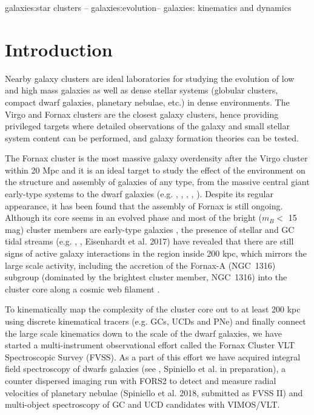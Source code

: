 \documentclass[useAMS,usenatbib]{mn2e}
\begin{document}
\begin{keywords}
galaxies:star clusters -- galaxies:evolution-- galaxies: kinematics and dynamics
\end{keywords}

\section{Introduction}

Nearby galaxy clusters are ideal laboratories for studying the evolution of 
low and high mass galaxies as well as dense stellar systems (globular 
clusters, compact dwarf galaxies, planetary nebulae, etc.) in dense environments. 
The Virgo and Fornax clusters are the closest galaxy clusters, hence providing 
privileged targets where detailed observations of the galaxy and small stellar 
system content can be performed, and galaxy formation theories can be tested. 

The Fornax cluster is the most massive galaxy overdensity after the Virgo cluster 
within 20 Mpc and it is an ideal target to study the effect of the environment 
on the structure and assembly of galaxies of any type, from the massive central 
giant early-type systems to the dwarf galaxies (e.g. \citealt{Ferguson89},  
\citealt{munoz+15}, \citealt{Iodice+16}, \citealt{venhola+17}, 
\citealt{Eigenthaler18}). Despite its regular appearance, 
it has been found that the assembly of Fornax is still ongoing. 
Although its core seems in an evolved phase \citep{Grillmair94,Jordan07} 
and most of the bright ($m_B < $  15 mag) cluster members are 
early-type galaxies \citep{Ferguson89}, the presence of stellar and GC tidal 
streams (e.g. \citealt{Iodice16}, \citealt{DAbrusco16}, Eisenhardt et al. 
2017) have revealed that there are still signs of active galaxy interactions in 
the region inside 200 kpc, which mirrors the large scale activity, including 
the accretion of the Fornax-A (NGC~1316) subgroup (dominated by the brightest 
cluster member, NGC~1316) into the cluster core along a 
cosmic web filament \citep{Drinkwater00,Scharf05}.

To kinematically map the complexity of the cluster core out to at least 200 kpc 
using discrete kinematical tracers (e.g. GCs, UCDs and PNe) and finally connect the 
large scale kinematics down to the scale of the dwarf galaxies, we have started 
a multi-instrument observational effort called the Fornax Cluster VLT 
Spectroscopic Survey (FVSS). As a part of this effort we have acquired integral 
field spectroscopy of dwarfs galaxies (see \citealt{mentz+16}, Spiniello et al. 
in preparation), a counter dispersed imaging run with FORS2 to detect and 
measure radial velocities of planetary nebulae (Spiniello et al. 2018, 
submitted as FVSS II) and multi-object spectroscopy of GC and UCD candidates 
with VIMOS/VLT.
\end{document}
